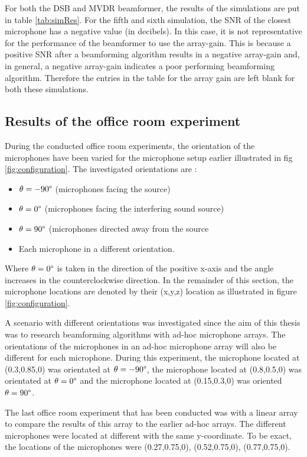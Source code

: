 For both the DSB and MVDR beamformer, the results of the simulations are put in table \ref{tab:simRes}. For the fifth and sixth simulation, the SNR of the closest microphone has a negative value (in decibels). In this case, it is not representative for the performance of the beamformer to use the array-gain. This is because a positive SNR after a beamforming algorithm results in a negative array-gain and, in general, a negative array-gain indicates a poor performing beamforming algorithm. Therefore the entries in the table for the array gain are left blank for both these simulations.

\subsection{Results of the office room experiment}

During the conducted office room experiments, the orientation of the microphones have been varied for the microphone setup earlier illustrated in fig \ref{fig:configuration}. The investigated orientations are :

\begin{itemize}
\item $\theta = -90\degree$ (microphones facing the source)
\item $\theta = 0\degree$ (microphones facing the interfering sound source)
\item $\theta = 90\degree$ (microphones directed away from the source
\item Each microphone in a different orientation.
\end{itemize}

Where $\theta = 0\degree$ is taken in the direction of the positive x-axis and the angle increases in the counterclockwise direction. In the remainder of this section, the microphone locations are denoted by their (x,y,z) location as illustrated in figure \ref{fig:configuration}. 

A scenario with different orientations was investigated since the aim of this thesis was to research beamforming algorithms with ad-hoc microphone arrays. The orientations of the microphones in an ad-hoc microphone array will also be different for each microphone. During this experiment, the microphone located at (0.3,0.85,0) was orientated at $\theta = -90\degree$, the microphone located at (0.8,0.5,0) was orientated at $\theta = 0\degree$ and the microphone located at (0.15,0.3,0) was oriented $\theta = 90\degree$. 

The last office room experiment that has been conducted was with a linear array to compare the results of this array to the earlier ad-hoc arrays. The different microphones were located at different  with the same y-coordinate. To be exact, the locations of the microphones were (0.27,0.75,0), (0.52,0.75,0), (0.77,0.75,0).

